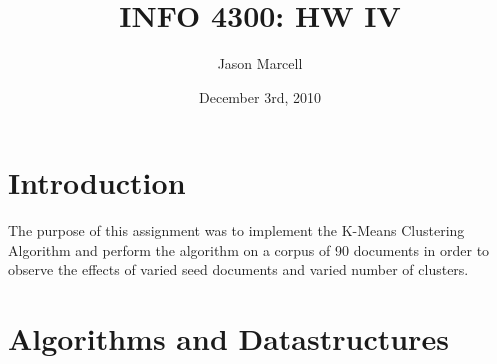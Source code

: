 \documentclass[12pt]{article}
\title{INFO 4300: HW IV}
\author{Jason Marcell}
\date{December 3rd, 2010}
\begin{document}
 
\maketitle 
\newpage
\section{Introduction} %
\label{sec:introduction}
The purpose of this assignment was to implement the K-Means Clustering Algorithm and perform the algorithm on a corpus of 90 documents in order to observe the effects of varied seed documents and varied number of clusters.

\section{Algorithms and Datastructures} %
\label{sec:algorithms_and_datastructures}
\end{document}
